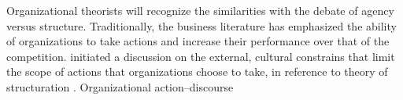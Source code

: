 \documentclass{article}
\begin{document}
	Organizational theorists will recognize the similarities with the debate of agency versus structure. Traditionally, the business literature has emphasized the ability of organizations to take actions and increase their performance over that of the competition. \citet{DiMaggio1983} initiated a discussion on the external, cultural constrains that limit the scope of actions that organizations choose to take, in reference to \citeauthor{Giddens1979} theory of structuration \citeyear{Giddens1979}. Organizational action--discourse



\end{document}
